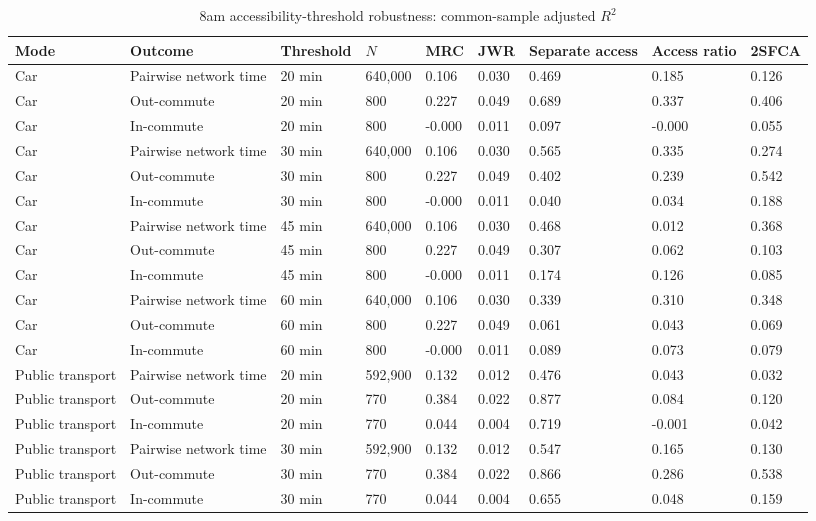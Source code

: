 \begin{landscape}
\begin{table}[htbp]
\centering
\scriptsize
\caption{8am accessibility-threshold robustness: common-sample adjusted $R^2$}
\label{tab:thresholds}
\begin{tabular}{lllllllll}
\toprule
Mode & Outcome & Threshold & $N$ & MRC & JWR & Separate access & Access ratio & 2SFCA \\
\midrule
Car & Pairwise network time & 20 min & 640,000 & 0.106 & 0.030 & 0.469 & 0.185 & 0.126 \\
Car & Out-commute & 20 min & 800 & 0.227 & 0.049 & 0.689 & 0.337 & 0.406 \\
Car & In-commute & 20 min & 800 & -0.000 & 0.011 & 0.097 & -0.000 & 0.055 \\
Car & Pairwise network time & 30 min & 640,000 & 0.106 & 0.030 & 0.565 & 0.335 & 0.274 \\
Car & Out-commute & 30 min & 800 & 0.227 & 0.049 & 0.402 & 0.239 & 0.542 \\
Car & In-commute & 30 min & 800 & -0.000 & 0.011 & 0.040 & 0.034 & 0.188 \\
Car & Pairwise network time & 45 min & 640,000 & 0.106 & 0.030 & 0.468 & 0.012 & 0.368 \\
Car & Out-commute & 45 min & 800 & 0.227 & 0.049 & 0.307 & 0.062 & 0.103 \\
Car & In-commute & 45 min & 800 & -0.000 & 0.011 & 0.174 & 0.126 & 0.085 \\
Car & Pairwise network time & 60 min & 640,000 & 0.106 & 0.030 & 0.339 & 0.310 & 0.348 \\
Car & Out-commute & 60 min & 800 & 0.227 & 0.049 & 0.061 & 0.043 & 0.069 \\
Car & In-commute & 60 min & 800 & -0.000 & 0.011 & 0.089 & 0.073 & 0.079 \\
Public transport & Pairwise network time & 20 min & 592,900 & 0.132 & 0.012 & 0.476 & 0.043 & 0.032 \\
Public transport & Out-commute & 20 min & 770 & 0.384 & 0.022 & 0.877 & 0.084 & 0.120 \\
Public transport & In-commute & 20 min & 770 & 0.044 & 0.004 & 0.719 & -0.001 & 0.042 \\
Public transport & Pairwise network time & 30 min & 592,900 & 0.132 & 0.012 & 0.547 & 0.165 & 0.130 \\
Public transport & Out-commute & 30 min & 770 & 0.384 & 0.022 & 0.866 & 0.286 & 0.538 \\
Public transport & In-commute & 30 min & 770 & 0.044 & 0.004 & 0.655 & 0.048 & 0.159 \\

\end{tabular}
\end{table}
\end{landscape}
